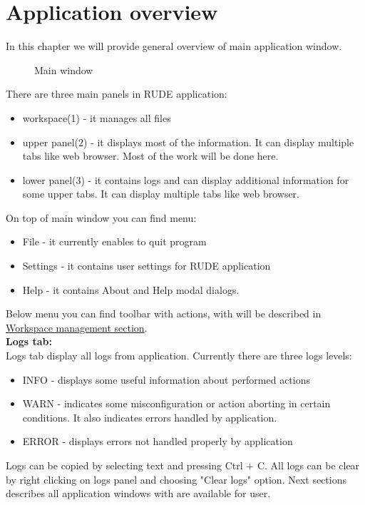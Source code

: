 \section{Application overview}\label{section:overview}

In this chapter we will provide general overview of main application window.

\begin{figure*}[!ht] 
	\centering
	\caption{Main window}
\end{figure*}

There are three main panels in RUDE application:
\begin{itemize}
	\item workspace(1) - it manages all files
	\item upper panel(2) - it displays most of the information. It can display multiple tabs like web browser. Most of the work will be done here.
	\item lower panel(3) - it contains logs and can display additional information for some upper tabs. It can display multiple tabs like web browser.
\end{itemize}

On top of main window you can find menu:
\begin{itemize}
	\item File - it currently enables to quit program
	\item Settings - it contains user settings for RUDE application
	\item Help - it contains About and Help modal dialogs.
\end{itemize}

Below menu you can find toolbar with actions, with will be described in \hyperref[section:workspace]{Workspace management section}.\\


\textbf{Logs tab:}\\
Logs tab display all logs from application. 
Currently there are three logs levels:
\begin{itemize}
	\item INFO - displays some useful information about performed actions
	\item WARN - indicates some misconfiguration or action aborting in certain conditions. It also indicates errors handled by application.
	\item ERROR - displays errors not handled properly by application
\end{itemize}

Logs can be copied by selecting text and pressing Ctrl + C. All logs can be clear by right clicking on logs panel and choosing "Clear logs" option.
\newline\newline
Next sections describes all application windows with are available for user.

\vfill\newpage